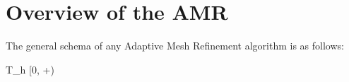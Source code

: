 \section{Overview of the AMR}
The general schema of any Adaptive Mesh Refinement algorithm is as follows:


\be
\label{refinementIndicator}
T_h \rightarrow [0, +\infty)
\ee